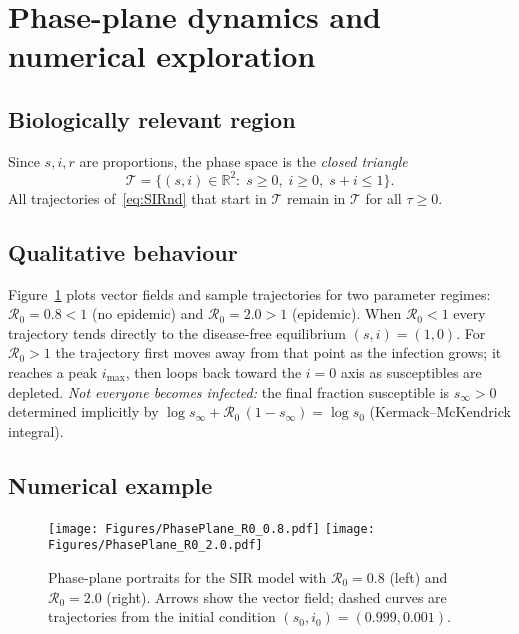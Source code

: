 \documentclass[11pt]{article}
\newcommand{\R}{\mathbb{R}}
\newcommand{\RR}{\mathcal{R}_0}
\begin{document}
\section{Phase-plane dynamics and numerical exploration}
\label{sec:PhasePlane}

\subsection*{Biologically relevant region}
Since $s,i,r$ are proportions, the phase space is the
\emph{closed triangle}
\[
\mathcal T=\{(s,i)\in\R^2:\; s\ge0,\; i\ge0,\; s+i\le1\}.
\]
All trajectories of~\cref{eq:SIRnd} that start in $\mathcal T$
remain in $\mathcal T$ for all $\tau\ge0$.

\subsection*{Qualitative behaviour}
Figure~\cref{fig:phaseplane} plots vector fields and sample trajectories
for two parameter regimes:
$\RR=0.8<1$ (no epidemic) and $\RR=2.0>1$ (epidemic).
When $\RR<1$ every trajectory tends directly to the
disease-free equilibrium $(s,i)=(1,0)$.
For $\RR>1$ the trajectory first moves away from that point
as the infection grows; it reaches a peak $i_{\max}$, then
loops back toward the $i=0$ axis as susceptibles are depleted.
\emph{Not everyone becomes infected:} the final fraction susceptible
is $s_{\infty}>0$ determined implicitly by
\(\log s_{\infty} + \RR\,(1-s_{\infty})=\log s_{0}\)
(Kermack–McKendrick integral).

\subsection*{Numerical example}
\begin{figure}[H]
\centering
\texttt{[image: Figures/PhasePlane\_R0\_0.8.pdf]}
\texttt{[image: Figures/PhasePlane\_R0\_2.0.pdf]}
\caption{Phase-plane portraits for the SIR model
with $\RR=0.8$ (left) and $\RR=2.0$ (right).
Arrows show the vector field; dashed curves are trajectories
from the initial condition $(s_0,i_0)=(0.999,0.001)$.}
\label{fig:phaseplane}
\end{figure}
\end{document}
